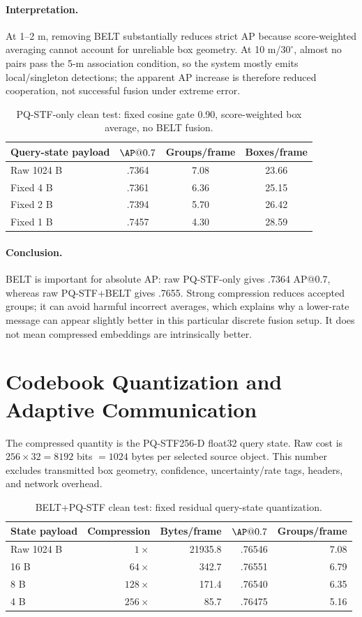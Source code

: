\documentclass[11pt]{article}
\newcommand{\PQSTF}{\textsc{PQ-STF}}
\begin{document}
\paragraph{Interpretation.} At 1--2 m, removing BELT substantially reduces strict AP because score-weighted averaging cannot account for unreliable box geometry.  At 10 m/$30^\circ$, almost no pairs pass the 5-m association condition, so the system mostly emits local/singleton detections; the apparent AP increase is therefore reduced cooperation, not successful fusion under extreme error.

\begin{table}[h]
\centering
\caption{PQ-STF-only clean test: fixed cosine gate 0.90, score-weighted box average, no BELT fusion.}
\begin{tabular}{lccc}
\toprule
Query-state payload & $\AP@0.7$ & Groups/frame & Boxes/frame\\
\midrule
Raw 1024 B & .7364 & 7.08 & 23.66\\
Fixed 4 B & .7361 & 6.36 & 25.15\\
Fixed 2 B & .7394 & 5.70 & 26.42\\
Fixed 1 B & .7457 & 4.30 & 28.59\\
\bottomrule
\end{tabular}
\end{table}

\paragraph{Conclusion.} BELT is important for absolute AP: raw PQ-STF-only gives .7364 AP@0.7, whereas raw PQ-STF+BELT gives .7655. Strong compression reduces accepted groups; it can avoid harmful incorrect averages, which explains why a lower-rate message can appear slightly better in this particular discrete fusion setup. It does not mean compressed embeddings are intrinsically better.

\section{Codebook Quantization and Adaptive Communication}

The compressed quantity is the \PQSTF 256-D float32 query state. Raw cost is $256\times32=8192$ bits $=1024$ bytes per selected source object. This number excludes transmitted box geometry, confidence, uncertainty/rate tags, headers, and network overhead.

\begin{table}[h]
\centering
\caption{BELT+PQ-STF clean test: fixed residual query-state quantization.}
\begin{tabular}{lrrrr}
\toprule
State payload & Compression & Bytes/frame & $\AP@0.7$ & Groups/frame\\
\midrule
Raw 1024 B & $1\times$ & 21935.8 & .76546 & 7.08\\
16 B & $64\times$ & 342.7 & .76551 & 6.79\\
8 B & $128\times$ & 171.4 & .76540 & 6.35\\
4 B & $256\times$ & 85.7 & .76475 & 5.16\\
\bottomrule
\end{tabular}
\end{table}
\end{document}
